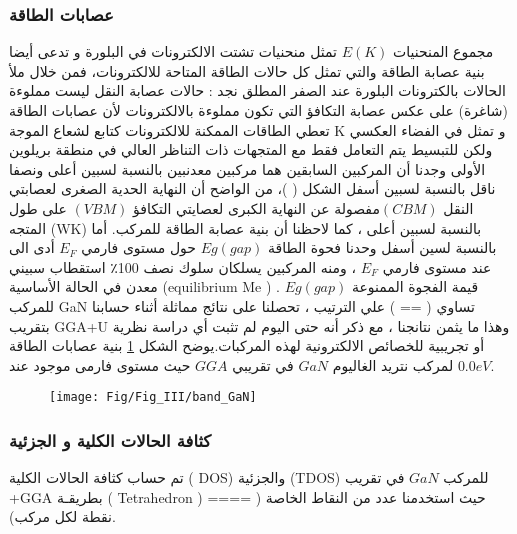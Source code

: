 \subsubsection{عصابات الطاقة}

مجموع المنحنيات  $ E(K) $ تمثل منحنيات تشتت الالكترونات في البلورة و تدعى أيضا بنية عصابة الطاقة والتي تمثل كل حالات الطاقة المتاحة للالكترونات، فمن خلال ملأ الحالات بالكترونات البلورة عند الصفر المطلق نجد : حالات عصابة النقل ليست مملوءة (شاغرة) على عكس عصابة التكافؤ التي تكون مملوءة بالالكترونات لأن عصابات الطاقة تعطي الطاقات الممكنة للالكترونات كتابع لشعاع الموجة K و تمثل في الفضاء العكسي ولكن للتبسيط يتم التعامل فقط مع المتجهات ذات التناظر العالي في منطقة بريلوين الأولى وجدنا أن المركبين السابقين هما مركبين معدنبين بالنسبة لسبين أعلى ونصفا ناقل بالنسبة لسبين أسفل الشكل (  )، من الواضح أن النهاية الحدية الصغرى لعصابتي النقل $ ( CBM)  $مفصولة عن النهاية الكبرى لعصايتي التكافؤ $ ( VBM ) $ على طول المتجه (WK) بالنسبة لسبين أعلى ، كما لاحظنا أن بنية عصابة الطاقة للمركب. أما بالنسبة لسين أسفل وحدنا فحوة الطاقة $ Eg ( gap ) $ حول مستوى فارمي $ E_{F} $ أدى الى استقطاب سبيني ‫‪٪‬‬100 عند مستوى فارمي $ E_{F} $ ، ومنه المركبين يسلكان سلوك نصف معدن في الحالة الأساسية (equilibrium Me ) . قيمة الفجوة الممنوعة $ Eg ( gap ) $ للمركب GaN تساوي  ( == ) علي الترتيب ، تحصلنا على نتائج مماثلة أثناء حسابنا بتقريب GGA+U وهذا ما يثمن نتانجنا ، مع ذكر أنه حتى اليوم لم تثبت أي دراسة نظرية أو تجريبية للخصائص الالكترونية لهذه المركبات.يوضح الشكل \ref{fig:bandgan} بنية عصابات الطاقة لمركب  نتريد الغاليوم $ GaN  $ في تقريبي $ GGA $  حيث مستوى فارمی موجود عند $0.0 eV $.

\begin{figure}[h!]
	\centering
	\texttt{[image: Fig/Fig\_III/band\_GaN]}
	\caption{}
	\label{fig:bandgan}
\end{figure}
\FloatBarrier

\subsubsection{كثافة الحالات الكلية و الجزئية}

تم حساب كثافة الحالات الكلية ( DOS) والجزئية (TDOS) للمركب $ GaN  $  في تقريب +GGA بطريقـة ( Tetrahedron ) حيث استخدمنا عدد من النقاط الخاصة ( ==== نقطة لكل مركب).

